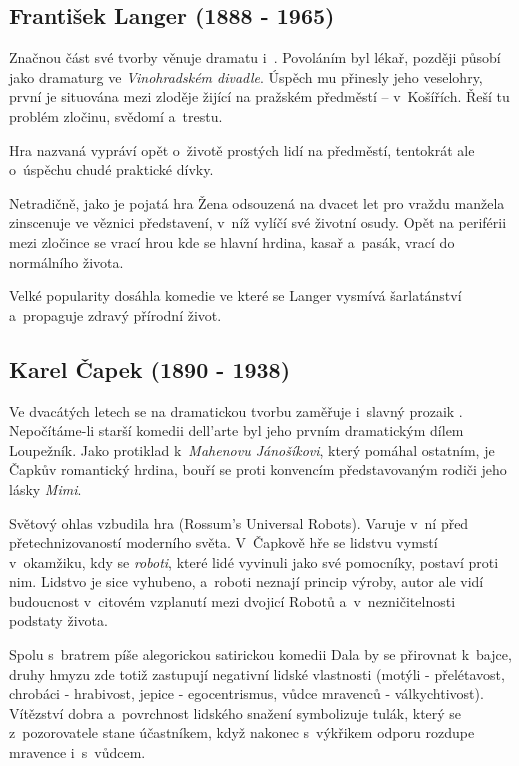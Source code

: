 \subsection*{František Langer (1888 - 1965)}
Značnou část své tvorby věnuje dramatu i~.
Povoláním byl lékař, později působí jako dramaturg ve \emph{Vinohradském
divadle}. Úspěch mu přinesly jeho veselohry, první  je
situována mezi zloděje žijící na pražském předměstí -- v~Košířích. Řeší
tu problém zločinu, svědomí a~trestu.

Hra nazvaná  vypráví opět o~životě prostých lidí na
předměstí, tentokrát ale o~úspěchu chudé praktické dívky.

Netradičně, jako  je pojatá hra
 Žena odsouzená na dvacet let pro vraždu manžela
zinscenuje ve věznici představení, v~níž vylíčí své životní osudy. Opět
na periférii mezi zločince se vrací hrou  kde se hlavní hrdina, kasař a~pasák, vrací do normálního
života.

Velké popularity dosáhla komedie  ve které se
Langer vysmívá šarlatánství a~propaguje zdravý přírodní život.

\subsection*{Karel Čapek (1890 - 1938)}
\label{sec:capekdrama}
Ve dvacátých letech se na dramatickou tvorbu zaměřuje i~slavný prozaik
. Nepočítáme-li starší komedii dell'arte  byl jeho prvním dramatickým dílem Loupežník. Jako protiklad
k~\emph{Mahenovu Jánošíkovi}, který pomáhal ostatním, je Čapkův
 romantický hrdina, bouří se proti konvencím
představovaným rodiči jeho lásky \emph{Mimi}.

Světový ohlas vzbudila hra  (Rossum's Universal Robots).
Varuje v~ní před přetechnizovaností moderního světa. V~Čapkově hře se
lidstvu vymstí v~okamžiku, kdy se \emph{roboti}, které lidé vyvinuli
jako své pomocníky, postaví proti nim. Lidstvo je sice vyhubeno,
a~roboti neznají princip výroby, autor ale vidí budoucnost v~citovém
vzplanutí mezi dvojicí Robotů a~v~nezničitelnosti podstaty života.

Spolu s~bratrem  píše alegorickou satirickou
komedii  Dala by se přirovnat k~bajce, druhy hmyzu zde
totiž zastupují negativní lidské vlastnosti (motýli - přelétavost,
chrobáci - hrabivost, jepice - egocentrismus, vůdce mravenců -
válkychtivost). Vítězství dobra a~povrchnost lidského snažení
symbolizuje tulák, který se z~pozorovatele stane účastníkem, když
nakonec s~výkřikem odporu  rozdupe
mravence i~s~vůdcem.

